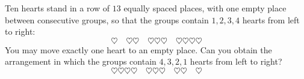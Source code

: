 Ten hearts stand in a row of $13$ equally spaced places, with one empty place between consecutive groups, so that the groups contain $1,2,3,4$ hearts from left to right:
\[\heartsuit\quad\heartsuit\heartsuit\quad\heartsuit\heartsuit\heartsuit\quad\heartsuit\heartsuit\heartsuit\heartsuit\]
You may move exactly one heart to an empty place. Can you obtain the arrangement in which the groups contain $4,3,2,1$ hearts from left to right?
\[\heartsuit\heartsuit\heartsuit\heartsuit\quad\heartsuit\heartsuit\heartsuit\quad\heartsuit\heartsuit\quad\heartsuit\]
